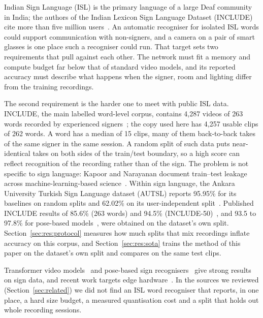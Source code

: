 \documentclass[pdflatex,sn-mathphys-num,twocolumn,lineno]{sn-jnl}
\theoremstyle{thmstyleone}%
\begin{document}
Indian Sign Language (ISL) is the primary language of a large Deaf community in India; the authors of the Indian Lexicon Sign Language Dataset (INCLUDE) cite more than five million users~\cite{sridhar2020include}. An automatic recogniser for isolated ISL words could support communication with non-signers, and a camera on a pair of smart glasses is one place such a recogniser could run. That target sets two requirements that pull against each other. The network must fit a memory and compute budget far below that of standard video models, and its reported accuracy must describe what happens when the signer, room and lighting differ from the training recordings.

The second requirement is the harder one to meet with public ISL data. INCLUDE, the main labelled word-level corpus, contains 4,287 videos of 263 words recorded by experienced signers~\cite{sridhar2020include}; the copy used here has 4,257 usable clips of 262 words. A word has a median of 15 clips, many of them back-to-back takes of the same signer in the same session. A random split of such data puts near-identical takes on both sides of the train/test boundary, so a high score can reflect recognition of the recording rather than of the sign. The problem is not specific to sign language: Kapoor and Narayanan document train--test leakage across machine-learning-based science~\cite{kapoor2023leakage}. Within sign language, the Ankara University Turkish Sign Language dataset (AUTSL) reports 95.95\% for its baselines on random splits and 62.02\% on its user-independent split~\cite{sincan2020autsl}. Published INCLUDE results of 85.6\% (263 words) and 94.5\% (INCLUDE-50)~\cite{sridhar2020include}, and 93.5 to 97.8\% for pose-based models~\cite{selvaraj2022openhands,patra2024hwgat}, were obtained on the dataset's own split. Section~\ref{sec:res:protocol} measures how much splits that mix recordings inflate accuracy on this corpus, and Section~\ref{sec:res:sota} trains the method of this paper on the dataset's own split and compares on the same test clips.

Transformer video models~\cite{arnab2021vivit,bertasius2021timesformer} and pose-based sign recognisers~\cite{bohacek2022spoter,jiang2021samslr,selvaraj2022openhands} give strong results on sign data, and recent work targets edge hardware~\cite{lamaakal2026tinymslr,venkatappa2026kannada}. In the sources we reviewed (Section~\ref{sec:related}) we did not find an ISL word recogniser that reports, in one place, a hard size budget, a measured quantisation cost and a split that holds out whole recording sessions.
\end{document}
